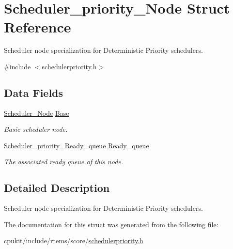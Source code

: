 \hypertarget{structScheduler__priority__Node}{}\section{Scheduler\+\_\+priority\+\_\+\+Node Struct Reference}
\label{structScheduler__priority__Node}


Scheduler node specialization for Deterministic Priority schedulers.  




{\ttfamily \#include $<$schedulerpriority.\+h$>$}

\subsection*{Data Fields}
\begin{DoxyCompactItemize}
\item 
\mbox{\label{structScheduler__priority__Node_a8e271f441e5a720788509aecede91094}} 
\mbox{\hyperlink{structScheduler__Node}{Scheduler\+\_\+\+Node}} \mbox{\hyperlink{structScheduler__priority__Node_a8e271f441e5a720788509aecede91094}{Base}}
\begin{DoxyCompactList}\small\item\em Basic scheduler node. \end{DoxyCompactList}\item 
\mbox{\label{structScheduler__priority__Node_a22b6165b135a1d72cac88e00fef876a5}} 
\mbox{\hyperlink{structScheduler__priority__Ready__queue}{Scheduler\+\_\+priority\+\_\+\+Ready\+\_\+queue}} \mbox{\hyperlink{structScheduler__priority__Node_a22b6165b135a1d72cac88e00fef876a5}{Ready\+\_\+queue}}
\begin{DoxyCompactList}\small\item\em The associated ready queue of this node. \end{DoxyCompactList}\end{DoxyCompactItemize}


\subsection{Detailed Description}
Scheduler node specialization for Deterministic Priority schedulers. 

The documentation for this struct was generated from the following file\+:\begin{DoxyCompactItemize}
\item 
cpukit/include/rtems/score/\mbox{\hyperlink{schedulerpriority_8h}{schedulerpriority.\+h}}\end{DoxyCompactItemize}
